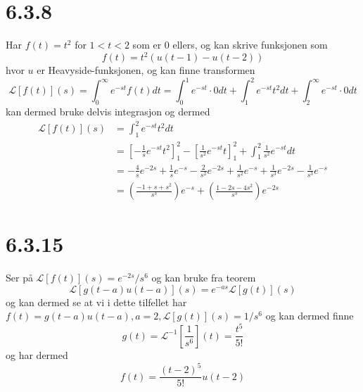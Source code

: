 \documentclass{report}
\newcommand{\nbrack}[1]{\left( #1 \right)}
\newcommand{\bbrack}[1]{\left[ #1 \right]}
\newcommand{\Lplc}[1]{\mathscr{L}\bbrack{ #1 } (s)}
\newcommand{\iLplc}[1]{\mathscr{L}^{-1}\bbrack{ #1 } (t)}
\begin{document}
\section*{6.3.8}
Har $f(t) = t^{2}$ for $1<t<2$ som er 0 ellers, og kan skrive funksjonen som
\begin{equation}
  \label{eq:23}
  f(t) = t^{2} \nbrack{ u(t-1) - u(t-2) }
\end{equation}
hvor $u$ er Heavyside-funksjonen, og kan finne transformen
\begin{equation}
  \label{eq:24}
  \Lplc{f(t)} = \int_{0}^{\infty} e^{-st}f(t) dt = \int_{0}^{1} e^{-st}\cdot 0 dt + \int_{1}^{2} e^{-st} t^{2} dt + \int_{2}^{\infty} e^{-st}\cdot 0 dt
\end{equation}
kan dermed bruke delvis integrasjon og dermed
\begin{equation}
  \label{eq:19}
  \begin{split}
    \Lplc{f(t)} &= \int_{1}^{2} e^{-st} t^{2} dt  \\
    &= \bbrack{ -\frac{1}{s}e^{-st} t^{2}}_{1}^{2} - \bbrack{\frac{1}{s^{2}} e^{-st}t}_{1}^{2} + \int_{1}^{2} \frac{1}{s^{2}}e^{-st} dt \\
    &= - \frac{4}{s} e^{-2s} + \frac{1}{s} e^{-s} - \frac{2}{s^{2}} e^{-2s} + \frac{1}{s^{2}} e^{-s} + \frac{1}{s^{3}} e^{-2s} - \frac{1}{s^{3}} e^{-s} \\
    &= \nbrack{ \frac{-1 + s + s^{2}}{s^{3}} } e^{-s} + \nbrack{ \frac{1 - 2s - 4s^{2}}{s^{3}} } e^{-2s}
  \end{split}
\end{equation}


\section*{6.3.15}
Ser på $\Lplc{f(t)} = e^{-2s}/s^{6}$ og kan bruke fra teorem
\begin{equation}
  \label{eq:22}
  \Lplc{g(t-a) u(t-a)} = e^{-as}\Lplc{g(t)}
\end{equation}
og kan dermed se at vi i dette tilfellet har $f(t) = g(t-a)u(t-a), a = 2, \Lplc{g(t)} = 1/s^{6}$ og kan dermed finne
\begin{equation}
  \label{eq:25}
  g(t) = \iLplc{\frac{1}{s^{6}}} = \frac{t^{5}}{5!}
\end{equation}
og har dermed
\begin{equation}
  \label{eq:26}
  f(t) = \frac{\nbrack{t-2}^{5}}{5!} u(t-2)
\end{equation}
\end{document}
